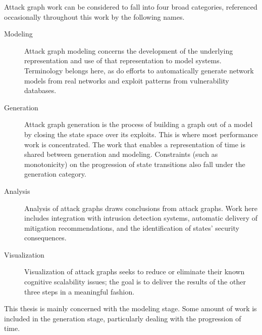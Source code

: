 Attack graph work can be considered to fall into four broad categories, referenced
occasionally throughout this work by the following names.
\begin{description}
\item[Modeling] Attack graph modeling concerns the development of the underlying representation
	and use of that representation to model systems. Terminology belongs here, as do efforts to
	automatically generate network models from real networks and exploit patterns from vulnerability
	databases.
\item[Generation] Attack graph generation is the process of building a graph out of a model by
	closing the state space over its exploits. This is where most performance work is concentrated.
	The work that enables a representation of time is shared between generation
    and modeling. Constraints (such as monotonicity) on the progression of 
    state transitions also fall under the generation category.
\item[Analysis] Analysis of attack graphs draws conclusions from attack graphs.
    Work here includes integration with intrusion detection
	systems, automatic delivery of mitigation recommendations, and the 
    identification of states' security consequences.
\item[Visualization] Visualization of attack graphs seeks to reduce or eliminate their
	known cognitive scalability issues; the goal is to deliver the results of the other three
	steps in a meaningful fashion.
\end{description}

This thesis is mainly concerned with the modeling stage. Some amount of work
is included in the generation stage, particularly
dealing with the progression of time.




